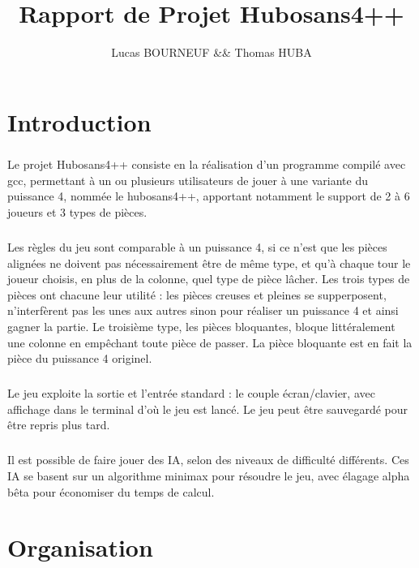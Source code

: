\documentclass{report}
\title{Rapport de Projet Hubosans4++}
\author{Lucas BOURNEUF \&\& Thomas HUBA}
\begin{document}
\maketitle


\chapter*{Introduction}
\paragraph*{}
Le projet Hubosans4++ consiste en la réalisation d'un programme compilé avec gcc, permettant à un ou plusieurs utilisateurs de jouer à une variante du puissance 4, nommée le hubosans4++,
apportant notamment le support de 2 à 6 joueurs et 3 types de pièces. 
\paragraph*{}
Les règles du jeu sont comparable à un puissance 4, si ce n'est que les pièces alignées ne doivent pas nécessairement être de même type, et qu'à chaque tour le joueur choisis, 
en plus de la colonne, quel type de pièce lâcher. Les trois types de pièces ont chacune leur utilité : les pièces creuses et pleines se supperposent, 
n'interfèrent pas les unes aux autres sinon pour réaliser un puissance 4 et ainsi gagner la partie. 
Le troisième type, les pièces bloquantes, bloque littéralement une colonne en empêchant toute pièce de passer. La pièce bloquante est en fait la pièce du puissance 4 originel.
\paragraph*{}
Le jeu exploite la sortie et l'entrée standard : le couple écran/clavier, avec affichage dans le terminal d'où le jeu est lancé.
Le jeu peut être sauvegardé pour être repris plus tard.
\paragraph*{}
Il est possible de faire jouer des IA, selon des niveaux de difficulté différents. Ces IA se basent sur un algorithme minimax pour résoudre le jeu, avec élagage alpha bêta pour économiser
du temps de calcul.



\chapter{Organisation}
\end{document}
